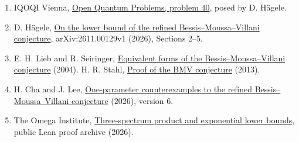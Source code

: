 \documentclass[11pt]{article}
\begin{document}
\small
\begin{enumerate}\setlength{\itemsep}{1pt}
\item IQOQI Vienna, \href{https://oqp.iqoqi.oeaw.ac.at/refinement-of-the-bessis-moussa-villani-conjecture/}{Open Quantum Problems, problem 40}, posed by D. H\"agele.
\item D. H\"agele, \href{https://arxiv.org/html/2611.00129v1}{On the lower bound of the refined Bessis--Moussa--Villani conjecture}, arXiv:2611.00129v1 (2026), Sections 2--5.
\item E. H. Lieb and R. Seiringer, \href{https://arxiv.org/abs/math-ph/0210027}{Equivalent forms of the Bessis--Moussa--Villani conjecture} (2004). H. R. Stahl, \href{https://arxiv.org/abs/1107.4875}{Proof of the BMV conjecture} (2013).
\item H. Cha and J. Lee, \href{https://arxiv.org/abs/2603.19927v6}{One-parameter counterexamples to the refined Bessis--Moussa--Villani conjecture} (2026), version 6.
\item The Omega Institute, \href{https://github.com/the-omega-institute/trureturing/blob/b5ab5d2d61023ceb5440dbfe3e143c39337cd04d/D5/S3/Quantum/Analysis/RefinedBMVThreeSpectrumCertificate.lean}{Three-spectrum product and exponential lower bounds}, public Lean proof archive (2026).
\end{enumerate}
\end{document}
